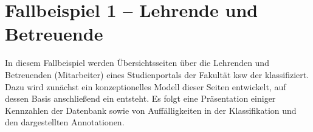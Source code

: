 \section{Fallbeispiel 1 -- Lehrende und Betreuende}
    \label{section:findingsCaseStudy1}
    In diesem Fallbeispiel werden Übersichtsseiten
    über die Lehrenden und Betreuenden (Mitarbeiter) eines Studienportals
    der Fakultät \gls{ksw} der {\fernUni} klassifiziert.
    Dazu wird zunächst ein konzeptionelles Modell dieser Seiten entwickelt,
    auf dessen Basis anschließend ein {\classificationModel} entsteht.
    Es folgt eine Präsentation einiger Kennzahlen der Datenbank
    sowie von Auffälligkeiten in der Klassifikation und den dargestellten Annotationen.

    
    
    
    
    
    
    
    
